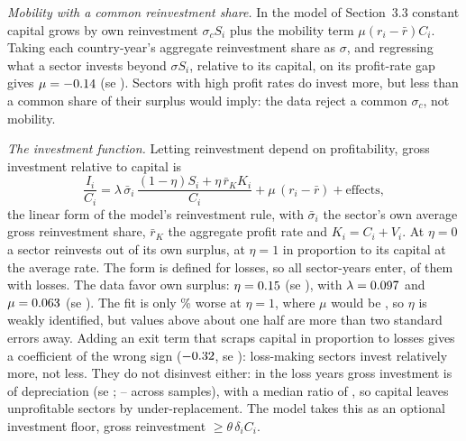 \documentclass[11pt]{article}
\begin{document}
\emph{Mobility with a common reinvestment share.} In the model of
Section~3.3 constant capital grows by own reinvestment $\sigma_cS_i$ plus
the mobility term $\mu(r_i-\bar r)C_i$. Taking each country-year's
aggregate reinvestment share as $\sigma$, and regressing what a sector
invests beyond $\sigma S_i$, relative to its capital, on its profit-rate
gap gives $\mu=-0.14$ (se \EstMuCommonSe). Sectors with high
profit rates do invest more, but less than a common share of their
surplus would imply: the data reject a common $\sigma_c$, not mobility.

\emph{The investment function.} Letting reinvestment depend on
profitability, gross investment relative to capital is
\begin{equation}
  \frac{I_i}{C_i}=\lambda\,\bar\sigma_i\,
  \frac{(1-\eta)S_i+\eta\,\bar r_KK_i}{C_i}+\mu\,(r_i-\bar r)+\text{effects},
  \label{eq:investment-function}
\end{equation}
the linear form of the model's reinvestment rule, with $\bar\sigma_i$ the
sector's own average gross reinvestment share, $\bar r_K$ the aggregate
profit rate and $K_i=C_i+V_i$. At $\eta=0$ a sector reinvests out of its
own surplus, at $\eta=1$ in proportion to its capital at the average
rate. The form is defined for losses, so all \EstRowsLinear{}
sector-years enter, \EstRowsLoss{} of them with losses. The data favor
own surplus: $\eta=0.15$ (se \EstEtaSe), with $\lambda=0.097$ and
$\mu=0.063$ (se \EstMuSe). The fit is only \EstSsrEtaOne\% worse at
$\eta=1$, where $\mu$ would be \EstMuAtEtaOne, so $\eta$ is weakly
identified, but values above about one half are more than two standard
errors away. Adding an exit term that scraps capital in proportion to
losses gives a coefficient of the wrong sign ($-0.32$, se
\EstExitPhiSe): loss-making sectors invest relatively more, not less.
They do not disinvest either: in the loss years gross investment is
\EstFloor{} of depreciation (se \EstFloorSe; \EstFloorMin--\EstFloorMax{}
across samples), with a median ratio of \EstFloorMedian, so capital
leaves unprofitable sectors by under-replacement. The model takes this as
an optional investment floor, gross reinvestment $\ge\theta\,\delta_iC_i$.
\end{document}
